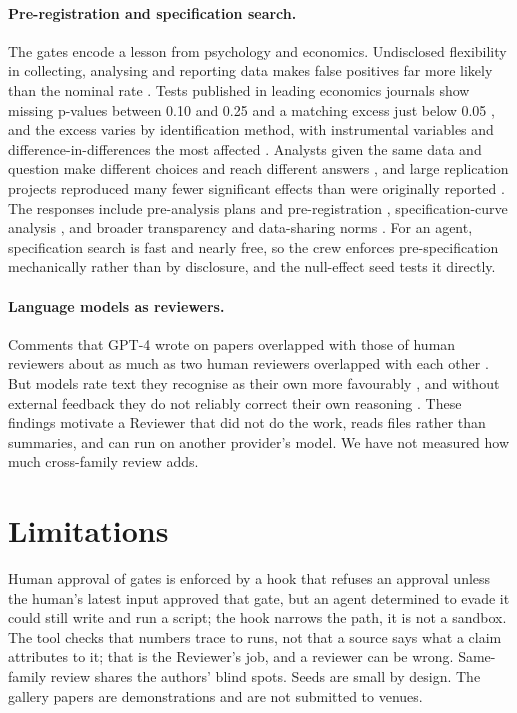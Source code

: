 \documentclass[11pt]{article}
\begin{document}
\paragraph{Pre-registration and specification search.} The gates encode a lesson from
psychology and economics. Undisclosed flexibility in collecting, analysing and reporting
data makes false positives far more likely than the nominal rate \citep{simmons2011}.
Tests published in leading economics journals show missing p-values between 0.10 and
0.25 and a matching excess just below 0.05 \citep{brodeur2016}, and the excess varies by identification
method, with instrumental variables and difference-in-differences the most affected
\citep{brodeur2020}. Analysts given the same data and question make different choices and
reach different answers \citep{silberzahn2018,huntingtonklein2021}, and large replication
projects reproduced many fewer significant effects than were originally reported
\citep{osc2015,camerer2016}. The responses include pre-analysis plans and pre-registration
\citep{olken2015,nosek2018}, specification-curve analysis \citep{simonsohn2020}, and
broader transparency and data-sharing norms \citep{christensen2018}. For an agent,
specification search is fast and nearly free, so the crew enforces pre-specification
mechanically rather than by disclosure, and the null-effect seed tests it directly.

\paragraph{Language models as reviewers.} Comments that GPT-4 wrote on papers overlapped
with those of human reviewers about as much as two human reviewers overlapped with each
other \citep{liang2024feedback}. But models rate text they recognise as their own more
favourably \citep{panickssery2024}, and without external feedback they do not reliably
correct their own reasoning \citep{huang2024selfcorrect}. These findings motivate a
Reviewer that did not do the work, reads files rather than summaries, and can run on
another provider's model. We have not measured how much cross-family review adds.

\section{Limitations}

Human approval of gates is enforced by a hook that refuses an approval unless the
human's latest input approved that gate, but an agent determined to evade it could
still write and run a script; the hook narrows the path, it is not a sandbox. The tool
checks that numbers trace to runs, not that a source says what a claim attributes to it;
that is the Reviewer's job, and a reviewer can be wrong. Same-family review shares the
authors' blind spots. Seeds are small by design. The gallery papers are demonstrations
and are not submitted to venues.



\end{document}
